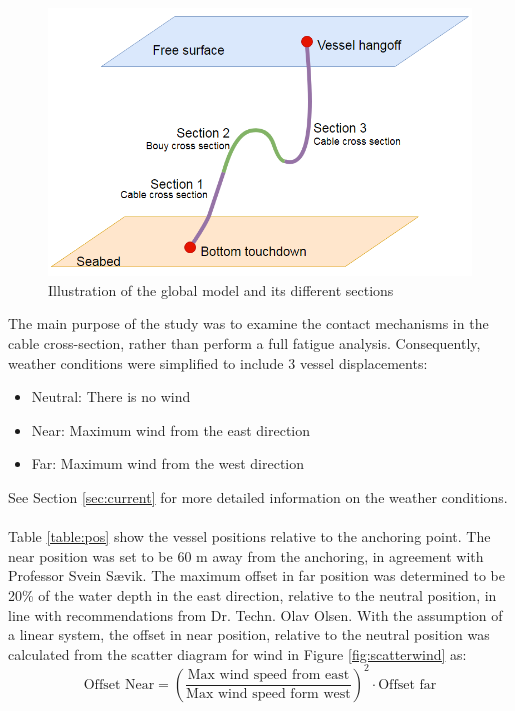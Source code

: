 \begin{figure}[H]
\centering
\includegraphics[scale=0.6]{figures/globalill}
\caption [$\; \:$ Illustration of the global model and its different sections ]{Illustration of the global model and its different sections}
 \label{fig:globalill}
\end{figure}
\noindent The main purpose of the study was to examine the contact mechanisms in the cable cross-section, rather than perform a full fatigue analysis. Consequently,  weather conditions were simplified to include 3 vessel displacements:
\begin{itemize}
    \item Neutral: There is no wind
    \item Near: Maximum wind from the east direction
    \item Far: Maximum wind from the west direction
\end{itemize}
See Section \ref{sec:current} for more detailed information on the weather conditions. \\\\
Table \ref{table:pos} show the vessel positions relative to the anchoring point. The near position was set to be 60 m away from the anchoring, in agreement with Professor Svein Sævik. The maximum offset in far position was determined to be 20\% of the water depth in the east direction, relative to the neutral position, in line with recommendations from Dr. Techn. Olav Olsen. With the assumption of a linear system, the offset in near position, relative to the neutral position was calculated from the scatter diagram for wind in Figure \ref{fig:scatterwind} as:
\begin{equation}
    \text{Offset Near}=\left(\frac{\text{Max  wind speed from east}}{\text{Max wind speed form west}}\right)^2 \cdot \text{Offset far}
\end{equation}

